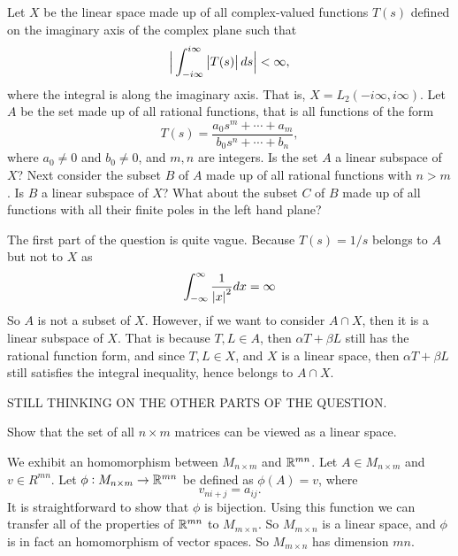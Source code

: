 \begin{problem}
	Let $ X $ be the linear space made up of all complex-valued functions $ T(s) $ defined on the imaginary axis of the complex plane such that
	\[ \big|\int_{-i\infty}^{i\infty} \left|T(s)\right| ds\big|<\infty, \] 
	where the integral is along the imaginary axis. That is, $ X = L_2(-i\infty,i\infty) $. Let $ A $ be the set made up of all rational functions, that is all functions of the form
	\[ T(s) = \frac{a_0s^m + \cdots + a_m}{b_0s^n + \cdots + b_n}, \]
	where $ a_0 \neq0 $ and $ b_0 \neq 0 $, and $ m,n $ are integers. Is the set $ A $ a linear subspace of $ X $? Next consider the subset $ B $ of $ A $ made up of all rational functions with $ n>m$. Is $ B $ a linear subspace of $ X $? What about the subset $ C $ of $ B $ made up of all functions with all their finite poles in the left hand plane?
\end{problem}

\begin{solution}
	The first part of the question is quite vague. Because $ T(s) = 1/s $ belongs to $ A $ but not to $ X $ as
	\[ \int_{-\infty}^{\infty} \frac{1}{\left|x\right|^2} dx = \infty \]
	So $ A $ is not a subset of $ X $. However, if we want to consider $ A\cap X $, then it is a linear subspace of $ X $. That is because $ T, L \in A $, then $ \alpha T + \beta L $ still has the rational function form, and since $ T,L \in X $, and $ X $ is a linear space, then $ \alpha T + \beta L $ still satisfies the integral inequality, hence belongs to $ A\cap X $.
	
	STILL THINKING ON THE OTHER PARTS OF THE QUESTION.
\end{solution}


\begin{problem}
	Show that the set of all $ n\times m $ matrices can be viewed as a linear space.
\end{problem}
\begin{solution}
	We exhibit an homomorphism between $ M_{n\times m} $ and $ \mathbb{R}^{mn} $. Let $ A \in M_{n\times m} $ and $ v \in R^{mn} $. Let $ \phi: M_{n\times m} \to \mathbb{R}^{mn} $ be defined as $ \phi(A) = v $, where
	\[ v_{ni+j} = a_{ij}. \]
	It is straightforward to show that $ \phi $ is bijection. Using this function we can transfer all of the properties of  $ \mathbb{R}^{mn} $ to $ M_{m\times n} $. So $ M_{m\times n} $ is a linear space, and $ \phi $ is in fact an homomorphism of vector spaces. So $ M_{m\times n} $ has dimension $ mn $.
\end{solution}



